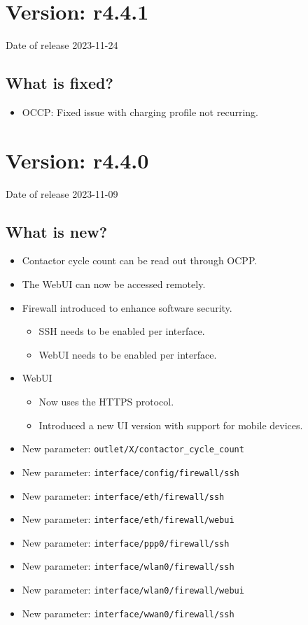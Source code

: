 \documentclass{scrartcl}
\begin{document}
\section{Version: r4.4.1}
Date of release 2023-11-24

\subsection*{What is fixed?}

\begin{itemize}
  \item OCCP: Fixed issue with charging profile not recurring.
\end{itemize}


\section{Version: r4.4.0}
Date of release 2023-11-09

\subsection*{What is new?}

\begin{itemize}
  \item Contactor cycle count can be read out through OCPP.
  \item The WebUI can now be accessed remotely.
  \item Firewall introduced to enhance software security.
  \begin{itemize}
    \item SSH needs to be enabled per interface.
    \item WebUI needs to be enabled per interface.
  \end{itemize}
  \item WebUI
  \begin{itemize}
    \item Now uses the HTTPS protocol.
    \item Introduced a new UI version with support for mobile devices.
  \end{itemize}
  \item New parameter: \verb!outlet/X/contactor_cycle_count!
  \item New parameter: \verb!interface/config/firewall/ssh!
  \item New parameter: \verb!interface/eth/firewall/ssh!
  \item New parameter: \verb!interface/eth/firewall/webui!
  \item New parameter: \verb!interface/ppp0/firewall/ssh!
  \item New parameter: \verb!interface/wlan0/firewall/ssh!
  \item New parameter: \verb!interface/wlan0/firewall/webui!
  \item New parameter: \verb!interface/wwan0/firewall/ssh!
\end{itemize}
\end{document}
